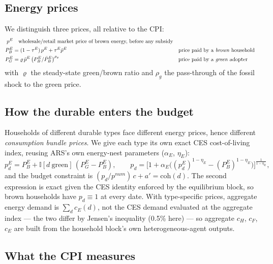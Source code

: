 \documentclass[11pt,a4paper]{article}
\begin{document}
\subsection{Energy prices}

We distinguish three prices, all relative to the CPI:
\begin{align*}
p^{E} &\quad\text{wholesale/retail market price of brown energy, before any subsidy}\\
P^{E}_{B} &= (1-\tau^{E})\,p^{E}+\tau^{E}\bar p^{E}
&&\text{price paid by a \emph{brown} household}\\
P^{E}_{G} &= \varrho\,\bar p^{E}\left(P^{E}_{B}/\bar P^{E}_{B}\right)^{\rho_g}
&&\text{price paid by a \emph{green} adopter}
\end{align*}
with $\varrho$ the steady-state green/brown ratio and $\rho_g$ the
pass-through of the fossil shock to the green price.

\subsection{How the durable enters the budget}

Households of different durable types face different energy prices, hence
different \emph{consumption bundle prices}. We give each type its own exact
CES cost-of-living index, reusing ARS's own energy-nest parameters
($\alpha_E$, $\eta_E$):
\[
p^{E}_{d}=P^{E}_{B}+\mathbb{I}[d\ \text{green}]\,(P^{E}_{G}-P^{E}_{B}),
\qquad
p_{d}=\Big[1+\alpha_E\big((p^{E}_{d})^{1-\eta_E}-(P^{E}_{B})^{1-\eta_E}\big)\Big]^{\frac{1}{1-\eta_E}},
\]
and the budget constraint is $(p_{d}/p^{num})\,c+a'=\mathrm{coh}(d)$. The
second expression is exact given the CES identity enforced by the equilibrium
block, so brown households have $p_d\equiv 1$ at every date. With
type-specific prices, aggregate energy demand is $\sum_d c_E(d)$, not the CES
demand evaluated at the aggregate index --- the two differ by Jensen's
inequality (0.5\% here) --- so aggregate $c_H$, $c_F$, $c_E$ are built from
the household block's own heterogeneous-agent outputs.

\subsection{What the CPI measures}
\label{sec:cpi}
\end{document}
